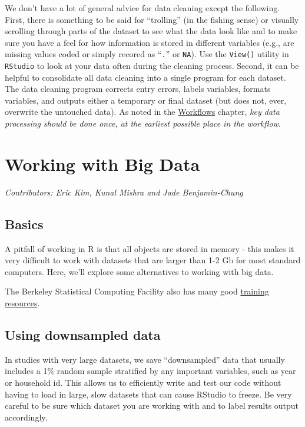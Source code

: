\documentclass[
]{book}
\begin{document}
We don't have a lot of general advice for data cleaning except the following. First, there is something to be said for ``trolling'' (in the fishing sense) or visually scrolling through parts of the dataset to see what the data look like and to make sure you have a feel for how information is stored in different variables (e.g., are missing values coded or simply recored as ``\texttt{.}'' or \texttt{NA}). Use the \texttt{View()} utility in \texttt{RStudio} to look at your data often during the cleaning process. Second, it can be helpful to consolidate all data cleaning into a single program for each dataset. The data cleaning program corrects entry errors, labels variables, formats variables, and outputs either a temporary or final dataset (but does not, ever, overwrite the untouched data). As noted in the \protect\hyperlink{workflows}{Workflows} chapter, \emph{key data processing should be done once, at the earliest possible place in the workflow}.

\hypertarget{bigdata}{%
\chapter{Working with Big Data}\label{bigdata}}

\emph{Contributors: Eric Kim, Kunal Mishra and Jade Benjamin-Chung}

\hypertarget{basics}{%
\section{Basics}\label{basics}}

A pitfall of working in R is that all objects are stored in memory - this makes it very difficult to work with datasets that are larger than 1-2 Gb for most standard computers. Here, we'll explore some alternatives to working with big data.

The Berkeley Statistical Computing Facility also has many good \href{http://statistics.berkeley.edu/computing/training}{training resources}.

\hypertarget{using-downsampled-data}{%
\section{Using downsampled data}\label{using-downsampled-data}}

In studies with very large datasets, we save ``downsampled'' data that usually includes a 1\% random sample stratified by any important variables, such as year or household id. This allows us to efficiently write and test our code without having to load in large, slow datasets that can cause RStudio to freeze. Be very careful to be sure which dataset you are working with and to label results output accordingly.
\end{document}

